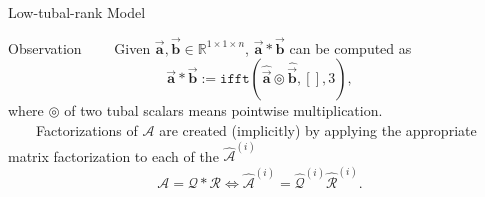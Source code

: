\documentclass[t, 10pt, handout, aspectratio=169]{beamer}
\begin{document}
\begin{frame}{Low-tubal-rank Model}

\begin{block}{Observation}
~~~~Given $\vec{\mathbf{a}}, \vec{\mathbf{b}} \in \mathbb{R}^{1\times 1\times n}$, $\vec{\mathbf{a}} * \vec{\mathbf{b}}$ can be computed as
$$
\vec{\mathbf{a}} * \vec{\mathbf{b}} := \texttt{ifft}(\hat{\vec{\mathbf{a}}} \circledcirc \hat{\vec{\mathbf{b}}}, [], 3),
$$
where $\circledcirc$ of two tubal scalars means pointwise multiplication.\\
~~~~Factorizations of $\mathcal{A}$ are created (implicitly) by applying the appropriate matrix factorization to each of the $\hat{\mathcal{A}}^{(i)}$
$$
\mathcal{A}=\mathcal{Q} * \mathcal{R} \Longleftrightarrow \hat{\mathcal{A}}^{(i)}=\hat{\mathcal{Q}}^{(i)}\hat{\mathcal{R}}^{(i)}.
$$
\end{block}
\end{frame}

\end{document}
